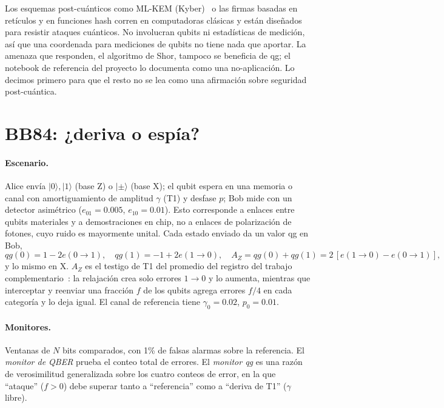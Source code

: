 \documentclass[11pt]{article}
\begin{document}
Los esquemas post-cuánticos como ML-KEM (Kyber)~\cite{fips203} o las firmas basadas en retículos y en
funciones hash corren en computadoras clásicas y están diseñados para resistir ataques cuánticos. No
involucran qubits ni estadísticas de medición, así que una coordenada para mediciones de qubits no tiene
nada que aportar. La amenaza que responden, el algoritmo de Shor, tampoco se beneficia de qg; el notebook
de referencia del proyecto lo documenta como una no-aplicación. Lo decimos primero para que el resto no se
lea como una afirmación sobre seguridad post-cuántica.

\section{BB84: ¿deriva o espía?}\label{sec:bb84}

\paragraph{Escenario.} Alice envía $|0\rangle,|1\rangle$ (base Z) o $|\pm\rangle$ (base X); el qubit espera
en una memoria o canal con amortiguamiento de amplitud $\gamma$ (T1) y desfase $p$; Bob mide con un
detector asimétrico ($e_{01}=0.005$, $e_{10}=0.01$). Esto corresponde a enlaces entre qubits materiales y
a demostraciones en chip, no a enlaces de polarización de fotones, cuyo ruido es mayormente unital. Cada
estado enviado da un valor qg en Bob,
\begin{equation}
qg(0)=1-2e(0\!\to\!1),\quad qg(1)=-1+2e(1\!\to\!0),\quad
A_Z=qg(0)+qg(1)=2\,[e(1\!\to\!0)-e(0\!\to\!1)],
\end{equation}
y lo mismo en X. $A_Z$ es el testigo de T1 del promedio del registro del trabajo
complementario~\cite{monteverde2026witness}: la relajación crea solo errores $1\to0$ y lo aumenta, mientras
que interceptar y reenviar una fracción $f$ de los qubits agrega errores $f/4$ en cada categoría y lo deja
igual. El canal de referencia tiene $\gamma_0=0.02$, $p_0=0.01$.

\paragraph{Monitores.} Ventanas de $N$ bits comparados, con 1\% de falsas alarmas sobre la referencia. El
\emph{monitor de QBER} prueba el conteo total de errores. El \emph{monitor qg} es una razón de
verosimilitud generalizada sobre los cuatro conteos de error, en la que ``ataque'' ($f>0$) debe superar
tanto a ``referencia'' como a ``deriva de T1'' ($\gamma$ libre).
\end{document}
